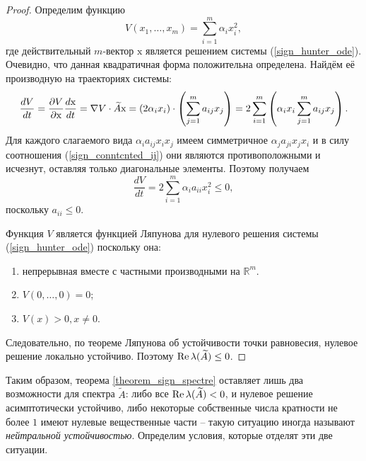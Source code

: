 \begin{proof}
        Определим функцию
        \begin{equation} \label{sign_lyapunov_func}
            V(x_1, \dots, x_m) = \sum_{i=1}^{m} \alpha_i x_i^2,
        \end{equation}
        где действительный \(m\)-вектор \(\mathrm{x}\) является решением системы (\ref{sign_hunter_ode}). Очевидно, что данная квадратичная форма положительна определена. Найдём её производную на траекториях системы:
        \begin{equation}
            \frac{dV}{dt} = \frac{\partial V}{\partial \mathrm{x}} \frac{d \mathrm{x}}{dt} = \nabla V \cdot \widetilde{A} \mathrm{x} = \left( 2 \alpha_i x_i \right) \cdot \left( \sum_{j=1}^{m} a_{ij} x_j \right) = 2 \sum_{i=1}^{m} \left( \alpha_i x_i  \sum_{j=1}^{m} a_{ij} x_j \right).
        \end{equation}
        Для каждого слагаемого вида \(\alpha_i a_{ij} x_i x_j\) имеем симметричное \(\alpha_j a_{ji} x_j x_i\) и в силу соотношения (\ref{sign_conntcnted_ij}) они являются противоположными и исчезнут, оставляя только диагональные элементы. Поэтому получаем
        \begin{equation} \label{sign_lyapunov_func_diag}
            \frac{dV}{dt} = 2 \sum_{i=1}^{m} \alpha_i a_{ii} x_i^2 \leq 0,
        \end{equation}
        поскольку \(a_{ii} \leq 0\).

        Функция \(V\) является функцией Ляпунова для нулевого решения системы (\ref{sign_hunter_ode}) поскольку она:
        \begin{enumerate}
            \item непрерывная вместе с частными производными на \(\mathbb{R}^m\).
            \item \(V(0, \dots, 0) = 0\);
            \item \( V(x) > 0, x\neq 0 \).
        \end{enumerate}
        Следовательно, по теореме Ляпунова об устойчивости точки равновесия, нулевое решение локально устойчиво. Поэтому \(\operatorname{Re} \lambda(\widetilde{A}) \leq 0\).
    \end{proof}

    Таким образом, теорема \ref{theorem_sign_spectre} оставляет лишь два возможности для спектра \(\widetilde{A}\): либо все \(\operatorname{Re} \lambda(\widetilde{A}) < 0\), и нулевое решение асимптотически устойчиво, либо некоторые собственные числа кратности не более \(1\) имеют нулевые вещественные части -- такую ситуацию иногда называют \textit{нейтральной устойчивостью}. Определим условия, которые отделят эти две ситуации.
    
